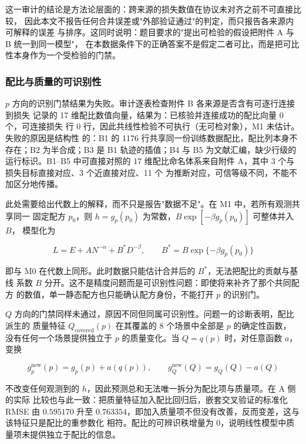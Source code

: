 \documentclass[bwprint]{gmcmthesis}
\numberwithin{equation}{section}
\numberwithin{figure}{section}
\numberwithin{table}{section}
\begin{document}
这一审计的结论是方法论层面的：跨来源的损失数值在协议未对齐之前不可直接比较，
因此本文不报告任何合并误差或"外部验证通过"的判定，而只报告各来源内可解释的误差
与排序。这同时说明：题目要求的"提出可检验的假设把附件 A 与 B 统一到同一模型"，
在本数据条件下的正确答案不是假定二者可比，而是把可比性本身作为一个受检验的门禁。

\subsubsection{配比与质量的可识别性}

$p$ 方向的识别门禁结果为失败。审计逐表检查附件 B 各来源是否含有可逐行连接到损失
记录的 17 维配比数值向量，结果为：已核验并连接成功的配比向量 0 个，可连接损失
行 0 行，因此共线性检验不可执行（无可检对象），M1 未估计。失败的原因是结构性
的：B1 的 1176 行共享同一份训练数据配比，配比列本身不存在；B2 为半合成；B3 是
B1 轨迹的插值；B4 与 B5 为文献汇编，缺少行级的运行标识。B1--B5 中可直接对照的
17 维配比命名体系来自附件 A，其中 3 个与损失目标直接对应、3 个近直接对应、11 个
为推断对应，可信等级不同，不能不加区分地传播。

此处需要给出代数上的解释，而不只是报告"数据不足"。在 M1 中，若所有观测共享同一
固定配方 $p_0$，则 $h=g_p(p_0)$ 为常数，$B\exp[-\beta g_p(p_0)]$ 可整体并入 $B$，
模型化为

\begin{equation}
L=E+AN^{-\alpha}+B^{*}D^{-\beta},\qquad B^{*}=B\exp\{-\beta g_p(p_0)\}
\end{equation}

即与 M0 在代数上同形。此时数据只能估计合并后的 $B^{*}$，无法把配比的贡献与基线
系数 $B$ 分开。这不是精度问题而是可识别性问题：即使将来补齐了那个共同配方
的数值，单一静态配方也只能确认配方身份，不能打开 $p$ 的识别门。

$Q$ 方向的门禁同样未通过，原因不同但同属可识别性。问题一的诊断表明，配比派生的
质量特征 $Q_{\mathrm{covered}}(p)$ 在其覆盖的 8 个场景中全部是 $p$ 的确定性函数，
没有任何一个场景提供独立于 $p$ 的质量变化。当 $Q=q(p)$ 时，对任意函数 $a$，变换

\begin{equation}
g_p^{\mathrm{new}}(p)=g_p(p)+a(q(p)),\qquad
g_Q^{\mathrm{new}}(Q)=g_Q(Q)-a(Q)
\end{equation}

不改变任何观测到的 $h$，因此预测总和无法唯一拆分为配比项与质量项。在 A 侧的实际
比较也与此一致：把质量特征加入配比回归后，嵌套交叉验证的标准化 RMSE 由 $0.595170$
升至 $0.763354$，即加入质量项不但没有改善，反而变差，这与该特征只是配比的重参数化
相符。配比的可辨识秩增量为 $0$，说明线性模型中质量项未提供独立于配比的信息。
\end{document}
